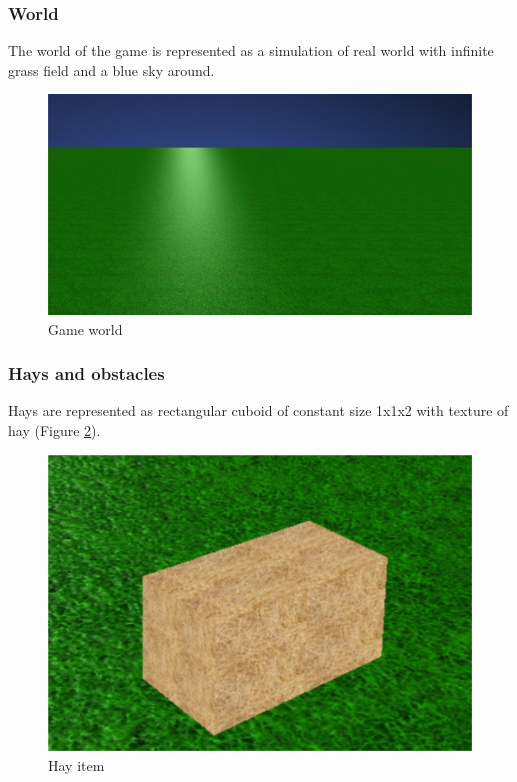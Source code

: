 \documentclass[12pt]{article}
\begin{document}
\subsubsection{World}
The world of the game is represented as a simulation of real world with infinite grass field and a blue sky around.

\begin{figure}[h!]
\begin{center}
\includegraphics[scale=0.4]{images/env.jpg}
\end{center}
\caption{Game world}
\label{world}
\end{figure}

\subsubsection{Hays and obstacles}
Hays are represented as rectangular cuboid of constant size 1x1x2 with texture of hay (Figure \ref{hay_item}).

\begin{figure}[h!]
\begin{center}
\includegraphics[scale=0.8]{images/hay.png}
\end{center}
\caption{Hay item}
\label{hay_item}
\end{figure}
\end{document}
